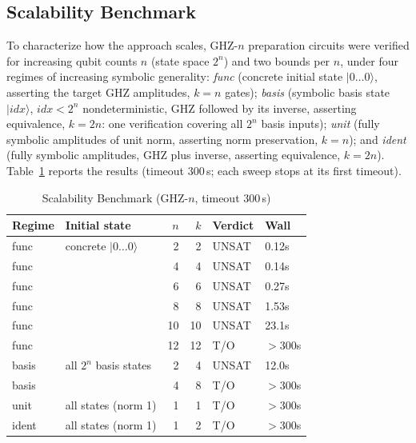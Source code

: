 \documentclass[journal]{IEEEtran} %
\begin{document}
\subsection{Scalability Benchmark}
\label{sec:benchmark}
To characterize how the approach scales, GHZ-$n$ preparation circuits were verified for increasing qubit counts $n$ (state space $2^n$) and two bounds per $n$, under four regimes of increasing symbolic generality: \emph{func} (concrete initial state $|0\ldots0\rangle$, asserting the target GHZ amplitudes, $k = n$ gates); \emph{basis} (symbolic basis state $|idx\rangle$, $idx < 2^n$ nondeterministic, GHZ followed by its inverse, asserting equivalence, $k = 2n$: one verification covering all $2^n$ basis inputs); \emph{unit} (fully symbolic amplitudes of unit norm, asserting norm preservation, $k = n$); and \emph{ident} (fully symbolic amplitudes, GHZ plus inverse, asserting equivalence, $k = 2n$). Table~\ref{tab:benchmark} reports the results (timeout 300\,s; each sweep stops at its first timeout).

\begin{table}[!t]
\centering
\caption{Scalability Benchmark (GHZ-$n$, timeout 300\,s)}
\label{tab:benchmark}
\footnotesize
\setlength{\tabcolsep}{4.5pt}
\begin{tabular}{@{}llrrll@{}}
\toprule
\textbf{Regime} & \textbf{Initial state} & \textbf{$n$} & \textbf{$k$} & \textbf{Verdict} & \textbf{Wall} \\
\midrule
func  & concrete $|0\ldots0\rangle$ & 2  & 2  & UNSAT & 0.12s \\
func  &                             & 4  & 4  & UNSAT & 0.14s \\
func  &                             & 6  & 6  & UNSAT & 0.27s \\
func  &                             & 8  & 8  & UNSAT & 1.53s \\
func  &                             & 10 & 10 & UNSAT & 23.1s \\
func  &                             & 12 & 12 & T/O   & $>$300s \\
\midrule
basis & all $2^n$ basis states      & 2  & 4  & UNSAT & 12.0s \\
basis &                             & 4  & 8  & T/O   & $>$300s \\
\midrule
unit  & all states (norm 1)         & 1  & 1  & T/O   & $>$300s \\
ident & all states (norm 1)         & 1  & 2  & T/O   & $>$300s \\
\bottomrule
\end{tabular}
\end{table}
\end{document}
